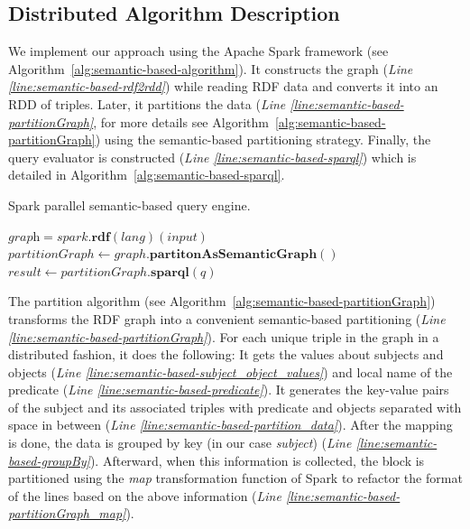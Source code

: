 \subsection{Distributed Algorithm Description}
\label{subsection:semantic-based-algorithm}
We implement our approach using the Apache Spark framework (see Algorithm~\ref{alg:semantic-based-algorithm}). 
It constructs the graph (\textit{Line \ref{line:semantic-based-rdf2rdd}}) while reading \gls{RDF} data and converts it into an \gls{RDD} of triples.
Later, it partitions the data (\textit{Line \ref{line:semantic-based-partitionGraph}}, for more details see Algorithm~\ref{alg:semantic-based-partitionGraph}) using the semantic-based partitioning strategy.
Finally, the query evaluator is constructed (\textit{Line \ref{line:semantic-based-sparql}}) which is detailed in Algorithm~\ref{alg:semantic-based-sparql}.

\begin{algorithm*}
\caption{Spark parallel semantic-based query engine.}
\label{alg:semantic-based-algorithm}
    $\textit{graph} = spark.\textbf{rdf}(lang)(input)$ \label{line:semantic-based-rdf2rdd}\\
    $partitionGraph \leftarrow graph.\textbf{partitonAsSemanticGraph}()$ \label{line:semantic-based-partitionGraph}\\
    $result \leftarrow partitionGraph.\textbf{sparql}(q)$ \label{line:semantic-based-sparql}\\
\end{algorithm*}

The partition algorithm (see Algorithm~\ref{alg:semantic-based-partitionGraph}) transforms the \gls{RDF} graph into a convenient semantic-based partitioning (\textit{Line \ref{line:semantic-based-partitionGraph}}).
For each unique triple in the graph in a distributed fashion, it does the following: It gets the values about subjects and objects (\textit{Line \ref{line:semantic-based-subject_object_values}}) and local name of the predicate (\textit{Line \ref{line:semantic-based-predicate}}).
It generates the key-value pairs of the subject and its associated triples with predicate and objects separated with space in between (\textit{Line \ref{line:semantic-based-partition_data}}).
After the mapping is done, the data is grouped by key (in our case \emph{subject}) (\textit{Line \ref{line:semantic-based-groupBy}}).
Afterward, when this information is collected, the block is partitioned using the \emph{map} transformation function of Spark to refactor the format of the lines based on the above information (\textit{Line \ref{line:semantic-based-partitionGraph_map}}).

